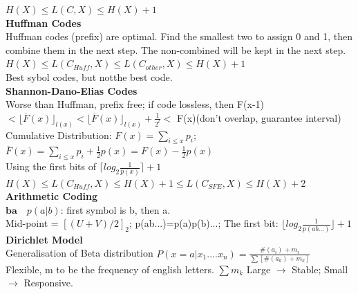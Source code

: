 \documentclass[12pt,a4paper]{extarticle}
\begin{document}
$H(X)\leq L(C,X)\leq H(X)+1$ \\
\newline
\textbf{Huffman Codes}\\
Huffman codes (prefix) are optimal. Find the smallest two to assign 0 and 1, then combine them in the next step. The non-combined will be kept in the next step.\\
$H(X)\leq L(C_{Huff},X)\leq L(C_{other},X)\leq H(X)+1$\\
Best sybol codes, but notthe best code.\\
\newline
\textbf{Shannon-Dano-Elias Codes}\\
Worse than Huffman, prefix free; if code lossless, then F(x-1)$<\lfloor \overline{F}(x)\rfloor _{l(x)}<\lfloor \overline{F}(x)\rfloor_{l(x)}+\frac{1}{2^l} <$ F(x)(don't overlap, guarantee interval)\\
Cumulative Distribution: $F(x)=\sum_{i\leq x}p_i$; \\
$\overline{F}(x)=\sum_{i\leq x} p_i+\frac{1}{2} p(x)=F(x)-\frac{1}{2} p(x)$\\
Using the first bits of $\lceil log_2\frac{1}{p(x)}\rceil +1$\\
$H(X)\leq L(C_{Huff},X)\leq H(X)+1 \leq L(C_{SFE},X)\leq H(X)+2$\\
\newline
\textbf{Arithmetic Coding}\\
$\textbf{ba} \quad p(a|b)$: first symbol is b, then a.\\
Mid-point = $[(U+V)/2]_2$; p(ab...)=p(a)p(b)...; The first bit: $\lfloor log_2 \frac{1}{p(ab...)}\rfloor+1$\\
\newline
\textbf{Dirichlet Model}\\
Generalisation of Beta distribution $P(x=a|x_1....x_n)=\frac{\# (a_i)+m_i}{\sum [\# (a_k)+m_k]}$\\
Flexible, m to be the frequency of english letters. $\sum m_k$ Large $\rightarrow $ Stable; Small $\rightarrow$ Responsive.\\
\end{document}
